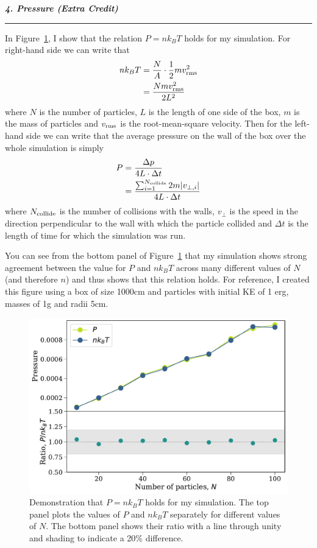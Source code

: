 \documentclass[12pt, letterpaper, twoside]{article}
\newcommand{\question}[1]{{\noindent \it #1}}
\newcommand{\answer}[1]{
    \par\noindent\rule{\textwidth}{0.4pt}#1\vspace{0.5cm}
}
\begin{document}
\question{\textbf{4. Pressure (Extra Credit)}}
\answer{
    In Figure~\ref{fig:4}, I show that the relation $P = n k_B T$ holds for my simulation. For right-hand side we can write that
    \begin{align}
        n k_B T &= \frac{N}{A} \cdot \frac{1}{2} m v_{\rm rms}^2 \\
                &= \frac{N m v_{\rm rms}^2}{2 L^2}
    \end{align}
    where $N$ is the number of particles, $L$ is the length of one side of the box, $m$ is the mass of particles and $v_{\rm rms}$ is the root-mean-square velocity. Then for the left-hand side we can write that the average pressure on the wall of the box over the whole simulation is simply
    \begin{align}
        P &= \frac{\Delta p}{4 L \cdot \Delta t} \\
          &= \frac{\sum_{i=1}^{N_{\rm collide}} 2 m \abs{v_{\perp, i}}}{4 L \cdot \Delta t}
    \end{align}
    where $N_{\rm collide}$ is the number of collisions with the walls, $v_{\perp}$ is the speed in the direction perpendicular to the wall with which the particle collided and $\Delta t$ is the length of time for which the simulation was run.
    
    You can see from the bottom panel of Figure~\ref{fig:4} that my simulation shows strong agreement between the value for $P$ and $n k_B T$ across many different values of $N$ (and therefore $n$) and thus shows that this relation holds. For reference, I created this figure using a box of size 1000cm and particles with initial KE of 1 erg, masses of 1g and radii 5cm.
    \begin{figure}[htb]
        \centering
        \includegraphics[width=\textwidth]{figures/4.pdf}
        \caption{Demonstration that $P = n k_B T$ holds for my simulation. The top panel plots the values of $P$ and $n k_B T$ separately for different values of $N$. The bottom panel shows their ratio with a line through unity and shading to indicate a 20\% difference.}
        \label{fig:4}
    \end{figure}
}
\end{document}
